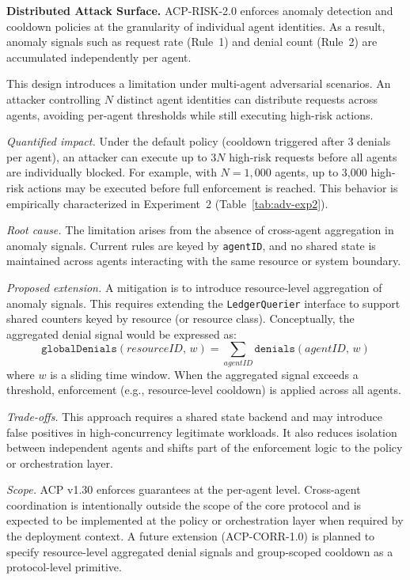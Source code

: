 \documentclass[11pt]{article}
\theoremstyle{definition}
\begin{document}
\textbf{Distributed Attack Surface.}
\label{sec:distributed-attack-surface}
ACP-RISK-2.0 enforces anomaly detection and cooldown policies at the granularity of individual
agent identities. As a result, anomaly signals such as request rate (Rule~1) and denial count
(Rule~2) are accumulated independently per agent.

This design introduces a limitation under multi-agent adversarial scenarios. An attacker
controlling $N$ distinct agent identities can distribute requests across agents, avoiding
per-agent thresholds while still executing high-risk actions.

\emph{Quantified impact.}
Under the default policy (cooldown triggered after 3 denials per agent), an attacker can
execute up to $3N$ high-risk requests before all agents are individually blocked.
For example, with $N = 1{,}000$ agents, up to 3{,}000 high-risk actions may be executed
before full enforcement is reached. This behavior is empirically characterized in
Experiment~2 (Table~\ref{tab:adv-exp2}).

\emph{Root cause.}
The limitation arises from the absence of cross-agent aggregation in anomaly signals.
Current rules are keyed by \texttt{agentID}, and no shared state is maintained across
agents interacting with the same resource or system boundary.

\emph{Proposed extension.}
A mitigation is to introduce resource-level aggregation of anomaly signals. This requires
extending the \texttt{LedgerQuerier} interface to support shared counters keyed by resource
(or resource class). Conceptually, the aggregated denial signal would be expressed as:
\[
\texttt{globalDenials}(\mathit{resourceID},\, w)
  = \sum_{\mathit{agentID}} \texttt{denials}(\mathit{agentID},\, w)
\]
where $w$ is a sliding time window.
When the aggregated signal exceeds a threshold, enforcement (e.g., resource-level cooldown)
is applied across all agents.

\emph{Trade-offs.}
This approach requires a shared state backend and may introduce false positives in
high-concurrency legitimate workloads. It also reduces isolation between independent
agents and shifts part of the enforcement logic to the policy or orchestration layer.

\emph{Scope.}
ACP v1.30 enforces guarantees at the per-agent level. Cross-agent coordination is
intentionally outside the scope of the core protocol and is expected to be implemented
at the policy or orchestration layer when required by the deployment context.
A future extension (ACP-CORR-1.0) is planned to specify resource-level aggregated
denial signals and group-scoped cooldown as a protocol-level primitive.
\end{document}
